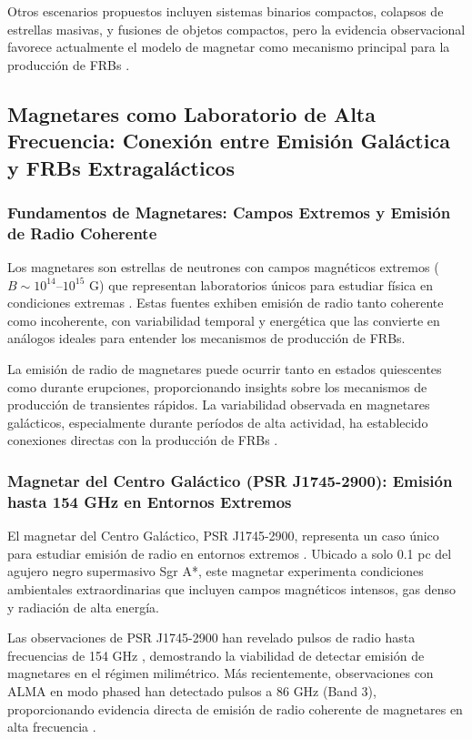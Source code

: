Otros escenarios propuestos incluyen sistemas binarios compactos, colapsos de estrellas masivas, y fusiones de objetos compactos, pero la evidencia observacional favorece actualmente el modelo de magnetar como mecanismo principal para la producción de FRBs \citep{Petroff_2022}.

\subsection{Magnetares como Laboratorio de Alta Frecuencia: Conexión entre Emisión Galáctica y FRBs Extragalácticos}

\subsubsection{Fundamentos de Magnetares: Campos Extremos y Emisión de Radio Coherente}

Los magnetares son estrellas de neutrones con campos magnéticos extremos ($B \sim 10^{14}$--$10^{15}$ G) que representan laboratorios únicos para estudiar física en condiciones extremas \citep{Bochenek2020}. Estas fuentes exhiben emisión de radio tanto coherente como incoherente, con variabilidad temporal y energética que las convierte en análogos ideales para entender los mecanismos de producción de FRBs.

La emisión de radio de magnetares puede ocurrir tanto en estados quiescentes como durante erupciones, proporcionando insights sobre los mecanismos de producción de transientes rápidos. La variabilidad observada en magnetares galácticos, especialmente durante períodos de alta actividad, ha establecido conexiones directas con la producción de FRBs \citep{CHIME_SGR2020}.

\subsubsection{Magnetar del Centro Galáctico (PSR J1745-2900): Emisión hasta 154 GHz en Entornos Extremos}

El magnetar del Centro Galáctico, PSR J1745-2900, representa un caso único para estudiar emisión de radio en entornos extremos \citep{Torne2015,Torne2017}. Ubicado a solo 0.1 pc del agujero negro supermasivo Sgr A*, este magnetar experimenta condiciones ambientales extraordinarias que incluyen campos magnéticos intensos, gas denso y radiación de alta energía.

Las observaciones de PSR J1745-2900 han revelado pulsos de radio hasta frecuencias de 154 GHz \citep{Torne2017}, demostrando la viabilidad de detectar emisión de magnetares en el régimen milimétrico. Más recientemente, observaciones con ALMA en modo phased han detectado pulsos a 86 GHz (Band 3), proporcionando evidencia directa de emisión de radio coherente de magnetares en alta frecuencia \citep{veracasanova2025}.


